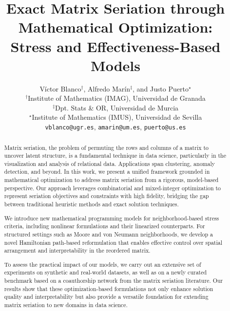 \documentclass[a4paper,11pt, reqno]{amsart}
\let\origmaketitle\maketitle
\def\maketitle{
	\begingroup
	\def\uppercasenonmath##1{} %
	\let\MakeUppercase\relax %
	\origmaketitle
	\endgroup
}
\begin{document}
\title[]{\Large Exact Matrix Seriation through Mathematical Optimization:\\Stress and Effectiveness-Based Models}

\author[V. Blanco, A. Mar\'in, \MakeLowercase{and} J. Puerto]{
{\large V\'ictor Blanco$^{\dagger}$, Alfredo Mar\'in$^{\ddagger}$, and Justo Puerto$^{\star}$}\medskip\\
$^\dagger$Institute of Mathematics (IMAG), Universidad de Granada\\
$^\ddagger$Dpt. Stats \& OR, Universidad de Murcia\\
$^\star$Institute of Mathematics (IMUS), Universidad de Sevilla\\
\texttt{vblanco@ugr.es}, \texttt{amarin@um.es}, \texttt{puerto@us.es}
}

\maketitle

\begin{abstract}
Matrix seriation, the problem of permuting the rows and columns of a matrix to uncover latent structure, is a fundamental technique in data science, particularly in the visualization and analysis of relational data. Applications span clustering, anomaly detection, and beyond. In this work, we present a unified framework grounded in mathematical optimization to address matrix seriation from a rigorous, model-based perspective. Our approach leverages combinatorial and mixed-integer optimization to represent seriation objectives and constraints with high fidelity, bridging the gap between traditional heuristic methods and exact solution techniques.

We introduce new mathematical programming models for neighborhood-based stress criteria, including nonlinear formulations and their linearized counterparts. For structured settings such as Moore and von Neumann neighborhoods, we develop a novel Hamiltonian path-based reformulation that enables effective control over spatial arrangement and interpretability in the reordered matrix.

To assess the practical impact of our models, we carry out an extensive set of experiments on synthetic and real-world datasets, as well as on a newly curated benchmark based on a coauthorship network from the matrix seriation literature. Our results show that these optimization-based formulations not only enhance solution quality and interpretability but also provide a versatile foundation for extending matrix seriation to new domains in data science.
\end{abstract}
 
\end{document}
